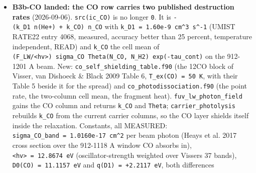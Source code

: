 \documentclass[english,a4paper]{my_memo}
\begin{document}
\begin{itemize}
  the sweep\textquotesingle s original order (sweep \texttt{heat} bit-identical); the sweep calls it
  once (181 inline lines of \texttt{ioniz\_eq} gone), \texttt{write\_heat\_breakdown\_eq} writes
  the module array \texttt{heat\_channel\_state} the sweep filled and forms no rate,
  \texttt{post\_process\_adv} calls the same routine. Private build of the live tree:
  \texttt{grid\_and\_gates} 93/0 with \texttt{heat\_column\_matches\_breakdown\_total} 1.678e-16
  (was 6.886e-3), \texttt{physics\_probe} 557/0 incl. \texttt{heating\_channel\_closure} and
  the scanner \texttt{heating\_sum\_uniqueness} (one exception recorded: the band
  ledger of \texttt{write\_output.f90} restates the Lyman-Werner and FUV photolysis
  event energies, a fourth copy, assigned HYG-LEDGER-EPS). \texttt{Heating\_breakdown.txt}
  18 -\textgreater{} 21 columns; \texttt{\_adv} profiles move by up to 1.8e-2 (the Balmer and
  associative deposits the third copy lacked). \texttt{heat\_channel\_state} is
  class-1 state and enters the attempted-step checkpoint through B3c-COST
  (owner of \texttt{attempted\_step.f90}), assigned. HYG-CLASS6 (class 4/6 wording,
  \texttt{acc\_resmax} over both classes) in the same landing.
\item
  \textbf{B3b-CO landed: the CO row carries two published destruction rates}
  (2026-09-06). \texttt{src(ic\_CO)} is no longer \texttt{0}. It is
  \texttt{-(k\_D1\ n(He+)\ +\ k\_CO)\ n\_CO} with \texttt{k\_D1\ =\ 1.60e-9\ cm\^{}3\ s\^{}-1} (UMIST
  RATE22 entry 4068, measured, accuracy better than 25 percent,
  temperature independent, READ) and \texttt{k\_CO} the cell mean of
  \texttt{(F\_LW/\textless{}hv\textgreater{})\ sigma\_CO\ Theta(N\_CO,\ N\_H2)\ exp(-tau\_cont)} on the
  912-1201 A beam. New: \texttt{co\_self\_shielding\_table.f90} (the 12CO block of
  Visser, van Dishoeck \& Black 2009 Table 6, \texttt{T\_ex(CO)\ =\ 50\ K}, with their
  Table 5 beside it for the spread) and \texttt{co\_photodissociation.f90} (the
  point rate, the two-column cell mean, the fragment heat).
  \texttt{fuv\_lw\_photon\_field} gains the CO column and returns \texttt{k\_CO} and \texttt{Theta};
  \texttt{carrier\_photolysis} rebuilds \texttt{k\_CO} from the current carrier columns, so
  the CO layer shields itself inside the relaxation. Constants, all
  MEASURED: \texttt{sigma\_CO\_band\ =\ 1.0160e-17\ cm\^{}2} per beam photon (Heays et al.
  2017 cross section over the 912-1118 A window CO absorbs in),
  \texttt{\textless{}hv\textgreater{}\ =\ 12.8674\ eV} (oscillator-strength weighted over Visser\textquotesingle s 37
  bands), \texttt{D0(CO)\ =\ 11.1157\ eV} and \texttt{q(D1)\ =\ +2.2117\ eV}, both differences

\end{itemize}
\end{document}
